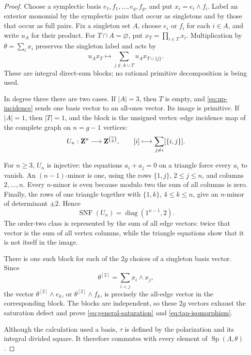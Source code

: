 \begin{proof}
Choose a symplectic basis \(e_1,f_1,\ldots,e_g,f_g\), and put
\(x_i=e_i\wedge f_i\).  Label an exterior monomial by the symplectic pairs
that occur as singletons and by those that occur as full pairs.  Fix a
singleton set \(A\), choose \(e_i\) or \(f_i\) for each \(i\in A\), and
write \(u_A\) for their product.  For \(T\cap A=\varnothing\), put
\(x_T=\prod_{i\in T}x_i\).  Multiplication by
\(\theta=\sum_i x_i\) preserves the singleton label and acts by
\begin{equation}\label{eq:up-incidence}
 u_Ax_T\longmapsto
 \sum_{j\notin A\cup T}u_Ax_{T\cup\{j\}}.
\end{equation}
These are integral direct-sum blocks; no rational primitive decomposition is
being used.

In degree three there are two cases.  If \(|A|=3\), then \(T\) is empty,
and \eqref{eq:up-incidence} sends one basis vector to an all-ones vector.
Its image is primitive.  If \(|A|=1\), then \(|T|=1\), and the block is the
unsigned vertex--edge incidence map of the complete graph on
\(n=g-1\) vertices:
\[
 U_n:\mathbf Z^n\longrightarrow\mathbf Z^{\binom n2},
 \qquad [i]\longmapsto\sum_{j\ne i}[\{i,j\}].
\]

For \(n\geq3\), \(U_n\) is injective: the equations
\(a_i+a_j=0\) on a triangle force every \(a_i\) to vanish.  An
\((n-1)\)-minor is one, using the rows \(\{1,j\}\), \(2\leq j\leq n\),
and columns \(2,\ldots,n\).  Every \(n\)-minor is even because modulo two
the sum of all columns is zero.  Finally, the rows of one triangle together
with \(\{1,k\}\), \(4\leq k\leq n\), give an \(n\)-minor of determinant
\(\pm2\).  Hence
\begin{equation}\label{eq:complete-graph-smith}
 \operatorname{SNF}(U_n)=\operatorname{diag}(1^{n-1},2).
\end{equation}
The order-two class is represented by the sum of all edge vectors: twice
that vector is the sum of all vertex columns, while the triangle equations
show that it is not itself in the image.

There is one such block for each of the \(2g\) choices of a singleton
basis vector.  Since
\[
 \theta^{[2]}=\sum_{i<j}x_i\wedge x_j,
\]
the vector \(\theta^{[2]}\wedge e_k\), or
\(\theta^{[2]}\wedge f_k\), is precisely the all-edge vector in the
corresponding block.  The blocks are independent, so these \(2g\) vectors
exhaust the saturation defect and prove \eqref{eq:general-saturation} and
\eqref{eq:tau-isomorphism}.

Although the calculation used a basis, \(\tau\) is defined by the
polarization and its integral divided square.  It therefore commutes with
every element of \(\operatorname{Sp}(\Lambda,\theta)\).
\end{proof}

